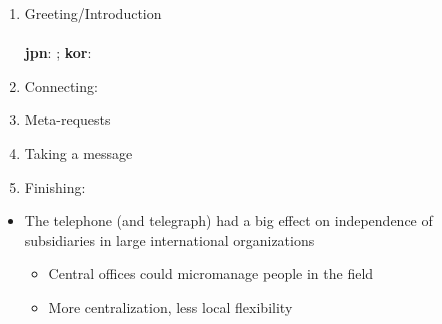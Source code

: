 \documentclass[a4paper,landscape,headrule,footrule,xetex]{foils}
\begin{document}
\begin{enumerate} \addtolength{\itemsep}{-1ex}
\item Greeting/Introduction
  \\ 
  \\ \textbf{jpn}: ; \textbf{kor}: 
\item Connecting:  
\item Meta-requests
 \\ 
\item Taking a message
\\ 
\item Finishing:
\end{enumerate}
\begin{quote}
\end{quote}




\begin{itemize}
\item The telephone (and telegraph) had a big effect on independence
  of subsidiaries in large international organizations \citep{Parkinson:1958}
  \begin{itemize}
  \item Central offices could micromanage people in the field
  \item More centralization, less local flexibility 
  \end{itemize}
\end{itemize}
\end{document}
